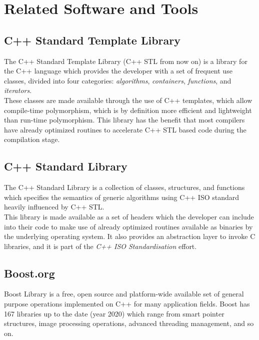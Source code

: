 \section{Related Software and Tools}

\subsection{C++ Standard Template Library}

The C++ Standard Template Library (C++ STL from now on) is a library for the C++ language which provides the developer with a set of frequent use classes, divided into four categories: \textit{algorithms}, \textit{containers}, \textit{functions}, and \textit{iterators}. \\

These classes are made available through the use of C++ templates, which allow compile-time polymorphism, which is by definition more efficient and lightweight than run-time polymorphism. This library has the benefit that most compilers have already optimized routines to accelerate C++ STL based code during the compilation stage.\\

\subsection{C++ Standard Library}

The C++ Standard Library is a collection of classes, structures, and functions which specifies the semantics of generic algorithms using C++ ISO standard heavily influenced by C++ STL. \\

This library is made available as a set of headers which the developer can include into their code to make use of already optimized routines available as binaries by the underlying operating system. It also provides an abstraction layer to invoke C libraries, and it is part of the \textit{C++ ISO Standardisation} effort.\\

\subsection{Boost.org}

Boost Library is a free, open source and platform-wide available set of general purpose operations implemented on C++ for many application fields. Boost has 167 libraries up to the date (year 2020) which range from smart pointer structures, image processing operations, advanced threading management, and so on. \\

